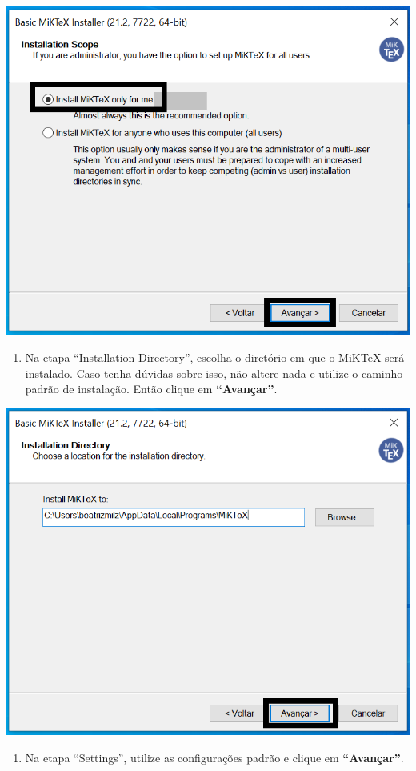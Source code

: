 \documentclass[
]{book}
\providecommand{\tightlist}{%
  \setlength{\itemsep}{0pt}\setlength{\parskip}{0pt}}
\begin{document}
\begin{center}\includegraphics[width=0.8\linewidth]{img/instalacao/miktex_windows/win_miktex2} \end{center}

\begin{enumerate}
\def\labelenumi{\arabic{enumi}.}
\setcounter{enumi}{3}
\tightlist
\item
  Na etapa ``Installation Directory'', escolha o diretório em que o MiKTeX será instalado. Caso tenha dúvidas sobre isso, não altere nada e utilize o caminho padrão de instalação. Então clique em \textbf{``Avançar''}.
\end{enumerate}

\begin{center}\includegraphics[width=0.8\linewidth]{img/instalacao/miktex_windows/win_miktex3} \end{center}

\begin{enumerate}
\def\labelenumi{\arabic{enumi}.}
\setcounter{enumi}{4}
\tightlist
\item
  Na etapa ``Settings'', utilize as configurações padrão e clique em \textbf{``Avançar''}.
\end{enumerate}
\end{document}

